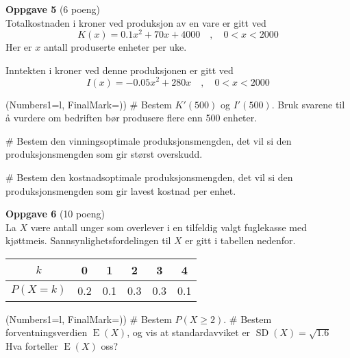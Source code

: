 \vfill
\vspace*{2em}
{\bfseries \large Oppgave 5} (6 poeng) \vspace*{1em} \\
Totalkostnaden i kroner ved produksjon av en vare er gitt ved
\begin{equation*}
	K(x) = 0.1x^2 + 70x + 4000 \quad , \quad 0 < x < 2000
\end{equation*}
Her er $x$ antall produserte enheter per uke.

Inntekten i kroner ved denne produksjonen er gitt ved
\begin{equation*}
	I(x) = -0.05x^2 + 280x \quad , \quad 0 < x < 2000
\end{equation*}
\begin{easylist}[enumerate]
	\ListProperties(Numbers1=l, FinalMark={)})
	# Bestem $K'(500)$ og $I'(500)$.
	Bruk svarene til å vurdere om bedriften bør produsere flere enn 500 enheter.
	
	# Bestem den vinningsoptimale produksjonsmengden, det vil si den produksjonsmengden som gir størst overskudd.
	
	# Bestem den kostnadsoptimale produksjonsmengden, det vil si den produksjonsmengden som gir lavest kostnad per enhet.
\end{easylist}
\vfill
\clearpage
{\bfseries \large Oppgave 6} (10 poeng) \vspace*{1em} \\
La $X$ være antall unger som overlever i en tilfeldig
valgt fuglekasse med kjøttmeis. Sannsynlighetsfordelingen
til $X$ er gitt i tabellen nedenfor.

\begin{center}
	\begin{tabular}{|c|c|c|c|c|c|}
		\hline
		$k$ & 0 & 1 & 2 & 3 & 4 \\ \hline
		$P(X = k)$ & 0.2 & 0.1 & 0.3 & 0.3 & 0.1 \\ \hline
	\end{tabular}
\end{center}
\begin{easylist}[enumerate]
	\ListProperties(Numbers1=l, FinalMark={)})
	# Bestem $P(X \geq 2)$.
	# Bestem forventningsverdien $\operatorname{E}(X)$,
	og vis at standardavviket er $\operatorname{SD}(X) = \sqrt{1.6}$\\
	Hva forteller $\operatorname{E}(X)$ oss?
\end{easylist}

